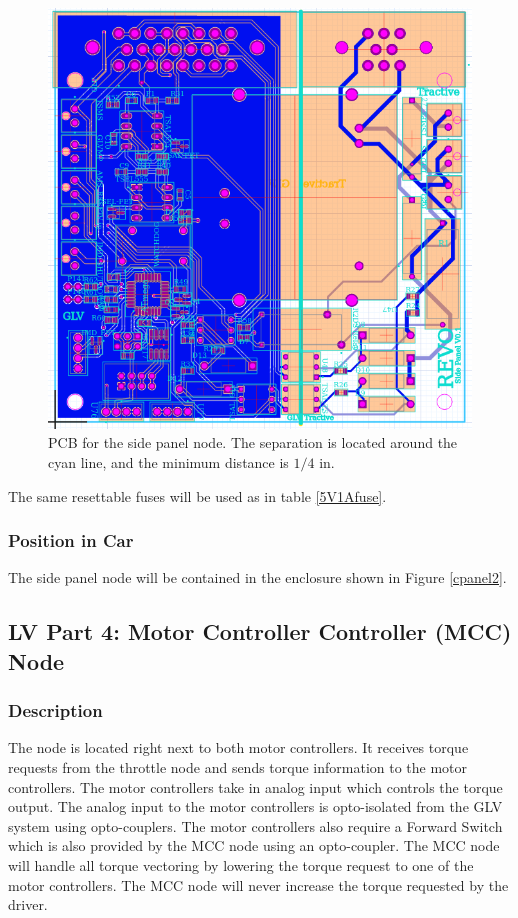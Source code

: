 \documentclass{article}
\begin{document}
            \begin{figure}[H]
            \centering
            \includegraphics[width = 0.5 \textwidth]{panelPCB}
            \caption{PCB for the side panel node. The separation is located around the cyan line, and the minimum distance is $1/4$ in.}
            \label{panelPCB}
            \end{figure}

            The same resettable fuses will be used as in table \ref{5V1Afuse}.

        \subsubsection{Position in Car}

            The side panel node will be contained in the enclosure shown in Figure \ref{cpanel2}.

    \subsection{LV Part 4: Motor Controller Controller (MCC) Node}

        \subsubsection{Description}
            The node is located right next to both motor controllers. It receives torque requests from the throttle node and sends torque information to the motor controllers. The motor controllers take in analog input which controls the torque output. The analog input to the motor controllers is opto-isolated from the GLV system using opto-couplers. The motor controllers also require a Forward Switch which is also provided by the MCC node using an opto-coupler.
            The MCC node will handle all torque vectoring by lowering the torque request to one of the motor controllers. The MCC node will never increase the torque requested by the driver.\\
\end{document}

